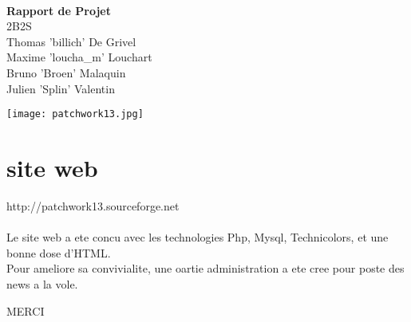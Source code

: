 \documentclass[14pt,a4paper]{report}
\begin{document}
\pagestyle{empty}

\begin{center}
\rule{0cm}{19mm} \\

{\Huge \textbf{Rapport de Projet}} \\[23mm]

{\huge 2B2S} \\[8mm]

Thomas 'billich' De Grivel \\
Maxime 'loucha\_m' Louchart \\
Bruno 'Broen' Malaquin \\
Julien 'Splin' Valentin \\[32mm]

\centerline{{\texttt{[image: patchwork13.jpg]}}}

\end{center}

\newpage
\setcounter{page}{1}

\tableofcontents

\newpage









\chapter{site web}
http://patchwork13.sourceforge.net
\\
\\
Le site web a ete concu avec les technologies Php, Mysql, 
Technicolors, et une bonne dose d'HTML.
\\
Pour ameliore sa convivialite, une oartie administration 
a ete cree pour poste des news a la vole.



\newpage
\begin{center}
MERCI
\end{center}
\end{document}

